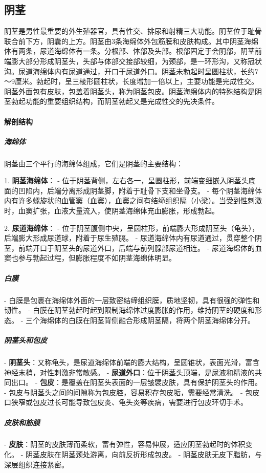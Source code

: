 \begin{enumerate}
\subsection{阴茎}

阴茎是男性最重要的外生殖器官，具有性交、排尿和射精三大功能。阴茎位于耻骨联合前下方，阴囊的上方。阴茎由3条海绵体外包筋膜和皮肤构成。其中阴茎海绵体有两条，尿道海绵体有一条。分根部、体部及头部。根部固定于会阴部，阴茎前端膨大部分形成阴茎头，头部与体部交接部较细，为颈部，是一环形沟，又称冠状沟。尿道海绵体内有尿道通过，开口于尿道外口。阴茎未勃起时呈圆柱状，长约7～9厘米。勃起时，呈三棱形圆柱状，长度增加一倍以上，主要功能是完成性交。阴茎外面包有皮肤，包盖着阴茎头，称为阴茎包皮。阴茎海绵体内的特殊结构是阴茎勃起功能的重要组织结构，而阴茎勃起又是完成性交的先决条件。

\paragraph{解剖结构}

\subparagraph{海绵体}
阴茎由三个平行的海绵体组成，它们是阴茎的主要结构：

1. \textbf{阴茎海绵体}：
   - 位于阴茎背侧，左右各一，呈圆柱形，前端变细嵌入阴茎头底面的凹陷内，后端分离形成阴茎脚，附着于耻骨下支和坐骨支。
   - 每个阴茎海绵体内有许多螺旋状的血管窦（血窦），血窦之间有结缔组织隔（小梁）。当受到性刺激时，血窦扩张，血液大量流入，使阴茎海绵体充血膨胀，形成勃起。

2. \textbf{尿道海绵体}：
   - 位于阴茎腹侧中央，呈圆柱形，前端膨大形成阴茎头（龟头），后端膨大形成尿道球，附着于尿生殖膈。
   - 尿道海绵体内有尿道通过，贯穿整个阴茎，前端开口于阴茎头的尿道外口，后端与前列腺部尿道相连。
   - 尿道海绵体的血窦也参与勃起过程，但膨胀程度不如阴茎海绵体明显。

\subparagraph{白膜}
- 白膜是包裹在海绵体外面的一层致密结缔组织膜，质地坚韧，具有很强的弹性和韧性。
- 白膜在阴茎勃起时起到限制海绵体过度膨胀的作用，维持阴茎的硬度和形态。
- 三个海绵体的白膜在阴茎背侧融合形成阴茎隔，将两个阴茎海绵体分开。

\subparagraph{阴茎头和包皮}
- \textbf{阴茎头}：又称龟头，是尿道海绵体前端的膨大结构，呈圆锥状，表面光滑，富含神经末梢，对性刺激非常敏感。
- \textbf{尿道外口}：位于阴茎头顶端，是尿液和精液的共同出口。
- \textbf{包皮}：是覆盖在阴茎头表面的一层皱襞皮肤，具有保护阴茎头的作用。
  - 包皮与阴茎头之间的间隙称为包皮腔，容易积存包皮垢，需要经常清洗。
  - 包皮口狭窄或包皮过长可能导致包皮炎、龟头炎等疾病，需要进行包皮环切手术。

\subparagraph{皮肤和筋膜}
- \textbf{皮肤}：阴茎的皮肤薄而柔软，富有弹性，容易伸展，适应阴茎勃起时的体积变化。
  - 阴茎皮肤在阴茎颈处游离，向前反折形成包皮。
  - 阴茎皮肤无皮下脂肪，与深层组织连接紧密。


\end{enumerate}
